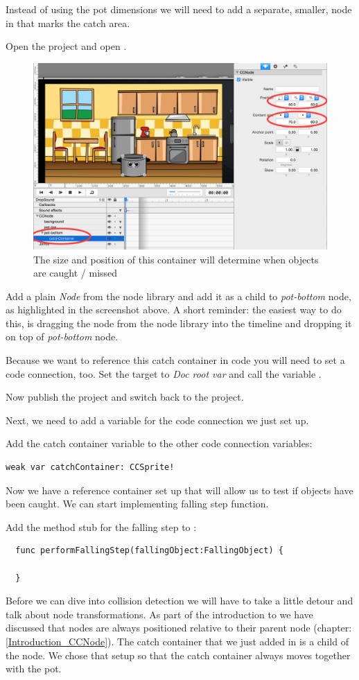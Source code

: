 Instead of using the pot dimensions we will need to add a separate, smaller,
node in \SB{} that marks the catch area. 
\begin{leftbar}
Open the \SB{} project and open .
\begin{figure}[H]
		\centering
		\includegraphics[width=0.8\linewidth]{images/Chapter6/add_catch_container.png}
		\caption{The size and position of this container will determine when objects
		are caught / missed}
\end{figure}
Add a plain \textit{Node} from the node library and add it as a child to
\textit{pot-bottom} node, as highlighted in the screenshot above. A short
reminder: the easiest way to do this, is dragging the node from the node library
into the timeline and dropping it on top of \textit{pot-bottom} node.

Because we want to reference this catch container in code you will need to set a
code connection, too. Set the target to \textit{Doc root var} and call the
variable .

Now publish the \SB{} project and switch back to the \xcode{} project.
\end{leftbar}
Next, we need to add a variable for the code connection we just set up.
\begin{leftbar}
Add the catch container variable to the other code connection variables:
\begin{lstlisting}
weak var catchContainer: CCSprite!
\end{lstlisting}
\end{leftbar}
Now we have a reference container set up that will allow us to test if objects
have been caught. We can start implementing falling step function.
\begin{leftbar}
Add the method stub for the falling step to :
\begin{lstlisting}
  func performFallingStep(fallingObject:FallingObject) {

  }
\end{lstlisting}
\end{leftbar}
Before we can dive into collision detection we will have to take a little detour
and talk about node transformations. As
part of the introduction to \cocos{} we have discussed that nodes are always positioned
relative to their parent node (chapter: \ref{Introduction_CCNode}). The catch
container that we just added in \SB{} is a child of the 
node. We chose that setup so that the catch container always moves together
with the pot. 

